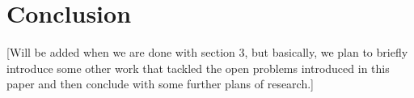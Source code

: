 \documentclass[11pt]{article}
\begin{document}
\section{Conclusion}

[Will be added when we are done with section 3, but basically, we plan to briefly introduce some other work that tackled the open problems introduced in this paper and then conclude with some further plans of research.]



\end{document}
